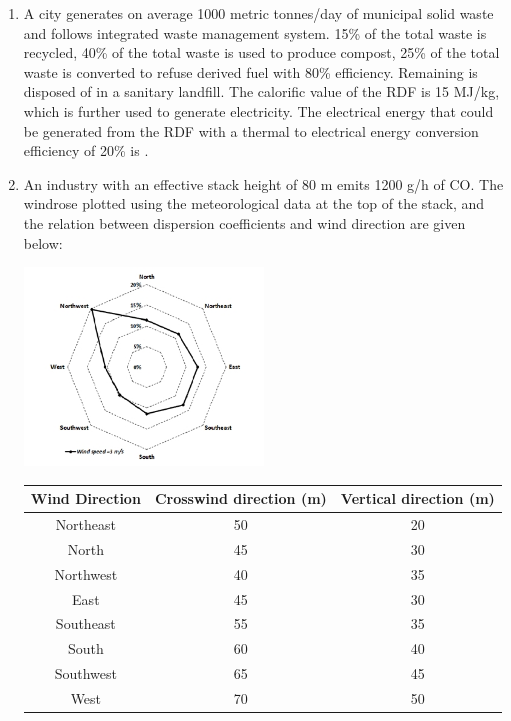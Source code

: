 \documentclass[journal,12pt,onecolumn]{IEEEtran}
\theoremstyle{remark}
\begin{document}
\begin{enumerate}
\item A city generates on average 1000 metric tonnes/day of municipal solid waste and follows integrated waste management system. 15\% of the total waste is recycled, 40\% of the total waste is used to produce compost, 25\% of the total waste is converted to refuse derived fuel  with 80\% efficiency. Remaining is disposed of in a sanitary landfill. The calorific value of the RDF is 15 MJ/kg, which is further used to generate electricity. The electrical energy that could be generated from the RDF with a thermal to electrical energy conversion efficiency of 20\% is \underline{\hspace{2cm}} .  
\hfill{}

\newpage

\item An industry with an effective stack height of 80 m emits 1200 g/h of CO. The windrose plotted using the meteorological data at the top of the stack, and the relation between dispersion coefficients and wind direction are given below:

\begin{center}
\includegraphics[width=0.5\textwidth]{figs/img 6 (2).jpeg}
\end{center}

\begin{table}[h!]
\centering
\begin{tabular}{|c|c|c|}
\hline
\textbf{Wind Direction} & \textbf{Crosswind direction (m)} & \textbf{Vertical direction (m)} \\ \hline
Northeast & 50 & 20 \\ \hline
North & 45 & 30 \\ \hline
Northwest & 40 & 35 \\ \hline
East & 45 & 30 \\ \hline
Southeast & 55 & 35 \\ \hline
South & 60 & 40 \\ \hline
Southwest & 65 & 45 \\ \hline
West & 70 & 50 \\ \hline
\end{tabular}
\end{table}


\end{enumerate}
\end{document}
